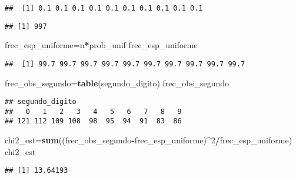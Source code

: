 \documentclass[
]{article}
\newenvironment{Shaded}{\begin{snugshade}}{\end{snugshade}}
\newcommand{\DecValTok}[1]{\textcolor[rgb]{0.00,0.00,0.81}{#1}}
\newcommand{\KeywordTok}[1]{\textcolor[rgb]{0.13,0.29,0.53}{\textbf{#1}}}
\newcommand{\NormalTok}[1]{#1}
\newcommand{\OperatorTok}[1]{\textcolor[rgb]{0.81,0.36,0.00}{\textbf{#1}}}
\begin{document}
\begin{verbatim}
##  [1] 0.1 0.1 0.1 0.1 0.1 0.1 0.1 0.1 0.1 0.1
\end{verbatim}

\begin{Shaded}
\end{Shaded}

\begin{verbatim}
## [1] 997
\end{verbatim}

\begin{Shaded}
\begin{Highlighting}[]
\NormalTok{frec_esp_uniforme=n}\OperatorTok{*}\NormalTok{prob_unif}
\NormalTok{frec_esp_uniforme }
\end{Highlighting}
\end{Shaded}

\begin{verbatim}
##  [1] 99.7 99.7 99.7 99.7 99.7 99.7 99.7 99.7 99.7 99.7
\end{verbatim}

\begin{Shaded}
\begin{Highlighting}[]
\NormalTok{frec_obs_segundo=}\KeywordTok{table}\NormalTok{(segundo_digito)}
\NormalTok{frec_obs_segundo}
\end{Highlighting}
\end{Shaded}

\begin{verbatim}
## segundo_digito
##   0   1   2   3   4   5   6   7   8   9 
## 121 112 109 108  98  95  94  91  83  86
\end{verbatim}

\begin{Shaded}
\begin{Highlighting}[]
\NormalTok{chi2_est=}\KeywordTok{sum}\NormalTok{((frec_obs_segundo}\OperatorTok{-}\NormalTok{frec_esp_uniforme)}\OperatorTok{^}\DecValTok{2}\OperatorTok{/}\NormalTok{frec_esp_uniforme)}
\NormalTok{chi2_est}
\end{Highlighting}
\end{Shaded}

\begin{verbatim}
## [1] 13.64193
\end{verbatim}
\end{document}
